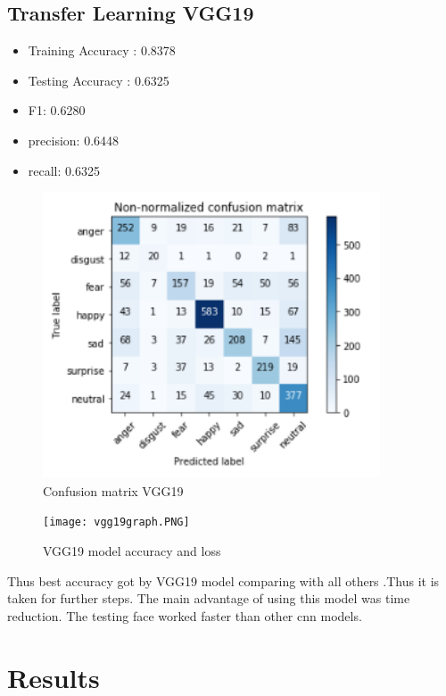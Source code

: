 \subsection{Transfer Learning VGG19}
\begin{itemize}
  \item Training Accuracy : 0.8378
  \item Testing Accuracy  : 0.6325
  \item F1: 0.6280
  \item precision: 0.6448
 \item  recall: 0.6325
\end{itemize}
\begin{figure}[h]
\label{ss}
\centering
\includegraphics[width= 10cm]{confmatr_vgg19.PNG}
\caption{Confusion matrix VGG19}
\end{figure}
\begin{figure}[h]
\label{ss}
\centering
\texttt{[image: vgg19graph.PNG]}
\caption{VGG19 model accuracy and loss}
\end{figure}

Thus best accuracy got by VGG19 model comparing with all others .Thus it is taken for further steps. The main advantage of using this model was time reduction. The testing face worked faster than other cnn models.
\section{Results}
